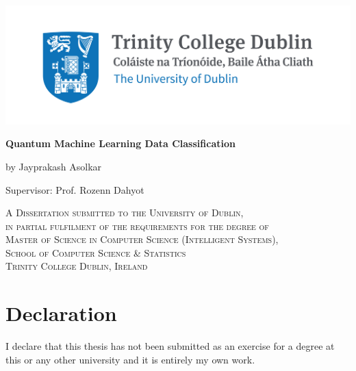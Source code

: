 \documentclass[english,a4paper,11pt,oneside,onecolumn]{book}
\begin{document}
\renewcommand{\footrulewidth}{1pt}







\begin{titlepage}
	\centering
	
\includegraphics[width=.8\linewidth]{Images/trinity-common-use.jpg}\par\vspace{2cm}
%
	\vspace{2cm}
	{\huge\bfseries Quantum Machine Learning Data Classification\par}
	\vspace{1cm}
	{\scshape \par}
	\vspace{2cm}
	{\Large by Jayprakash Asolkar \par}
	{\Large Supervisor: Prof. Rozenn Dahyot \par}
 \vspace{1cm}
{\scshape 
A Dissertation submitted to the University of Dublin,\\
in partial fulfilment of the requirements for the degree of\\
Master of Science in Computer Science (Intelligent Systems),\\
School of Computer Science \& Statistics\\ 
Trinity College Dublin, Ireland\\
}
\end{titlepage}

\clearpage

\chapter*{Declaration}

I declare that this thesis has not been submitted as an exercise for a degree at this or
any other university and it is entirely my own work.

\vspace{0.5cm}
\end{document}
